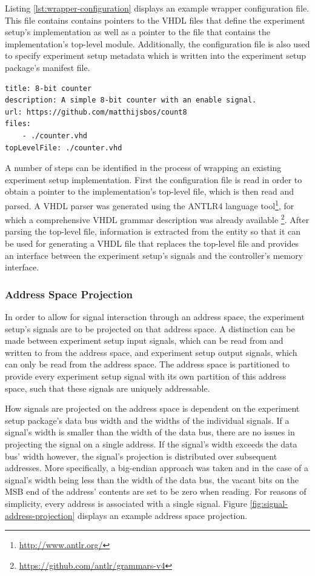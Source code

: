 \documentclass[main.tex]{subfiles}
\begin{document}
Listing \ref{lst:wrapper-configuration} displays an example wrapper configuration file. This file contains contains pointers to the VHDL files that define the experiment setup's implementation as well as a pointer to the file that contains the implementation's top-level module. Additionally, the configuration file is also used to specify experiment setup metadata which is written into the experiment setup package's manifest file. 

\begin{lstlisting}[caption={Example \texttt{fpgaedu.yaml} wrapper configuration file for a simple 8-bit counter implementation.}, label={lst:wrapper-configuration}]
title: 8-bit counter
description: A simple 8-bit counter with an enable signal.
url: https://github.com/matthijsbos/count8
files: 
    - ./counter.vhd
topLevelFile: ./counter.vhd
\end{lstlisting}

A number of steps can be identified in the process of wrapping an existing experiment setup implementation. First the configuration file is read in order to obtain a pointer to the implementation's top-level file, which is then read and parsed. A VHDL parser was generated using the ANTLR4 language tool\footnote{\url{http://www.antlr.org/}}, for which a comprehensive VHDL grammar description was already available \footnote{\url{https://github.com/antlr/grammars-v4}}. After parsing the top-level file, information is extracted from the entity so that it can be used for generating a VHDL file that replaces the top-level file and provides an interface between the experiment setup's signals and the controller's memory interface. 

\subsubsection{Address Space Projection}
In order to allow for signal interaction through an address space, the experiment setup's signals are to be projected on that address space. A distinction can be made between experiment setup input signals, which can be read from and written to from the address space, and experiment setup output signals, which can only be read from the address space. The address space is partitioned to provide every experiment setup signal with its own partition of this address space, such that these signals are uniquely addressable. 

How signals are projected on the address space is dependent on the experiment setup package's data bus width and the widths of the individual signals. If a signal's width is smaller than the width of the data bus, there are no issues in projecting the signal on a single address. If the signal's width exceeds the data bus' width however, the signal's projection is distributed over subsequent addresses. More specifically, a big-endian approach was taken and in the case of a signal's width being less than the width of the data bus, the vacant bits on the MSB end of the address' contents are set to be zero when reading. For reasons of simplicity, every address is associated with a single signal. Figure \ref{fig:signal-address-projection} displays an example address space projection. 
\end{document}
